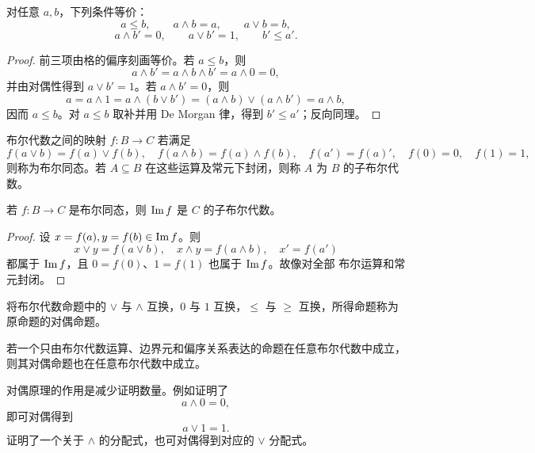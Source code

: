 \begin{theorem}[布尔代数中的偏序判定]\label{boolean-order-test}
  对任意 $a,b$，下列条件等价：
  \[
  a\le b,\qquad a\wedge b=a,\qquad a\vee b=b,
  \]
  \[
  a\wedge b'=0,\qquad a\vee b'=1,\qquad b'\le a'.
  \]
\end{theorem}

\begin{proof}
  前三项由格的偏序刻画等价。若 $a\le b$，则
  \[
  a\wedge b'=a\wedge b\wedge b'=a\wedge0=0,
  \]
  并由对偶性得到 $a\vee b'=1$。若 $a\wedge b'=0$，则
  \[
  a=a\wedge1=a\wedge(b\vee b')=(a\wedge b)\vee(a\wedge b')=a\wedge b,
  \]
  因而 $a\le b$。对 $a\le b$ 取补并用 De Morgan 律，得到
  $b'\le a'$；反向同理。
\end{proof}

\begin{definition}[布尔同态与子布尔代数]\label{boolean-homomorphism}
  布尔代数之间的映射 $f:B\to C$ 若满足
  \[
  f(a\vee b)=f(a)\vee f(b),\quad f(a\wedge b)=f(a)\wedge f(b),
  \quad f(a')=f(a)',\quad f(0)=0,\quad f(1)=1,
  \]
  则称为布尔同态。若 $A\subseteq B$ 在这些运算及常元下封闭，则称 $A$ 为
  $B$ 的子布尔代数。
\end{definition}

\begin{theorem}[布尔同态的像]\label{boolean-image}
  若 $f:B\to C$ 是布尔同态，则 $\operatorname{Im} f$ 是 $C$ 的子布尔代数。
\end{theorem}

\begin{proof}
  设 $x=f(a),y=f(b)\in\operatorname{Im} f$。则
  \[
  x\vee y=f(a\vee b),\quad x\wedge y=f(a\wedge b),\quad x'=f(a')
  \]
  都属于 $\operatorname{Im} f$，且 $0=f(0)$、$1=f(1)$ 也属于 $\operatorname{Im} f$。故像对全部
  布尔运算和常元封闭。
\end{proof}

\begin{definition}[对偶]\label{dual}
  将布尔代数命题中的 $\vee$ 与 $\wedge$ 互换，$0$ 与 $1$ 互换，$\le$ 与 $\ge$ 互换，所得命题称为原命题的对偶命题。
\end{definition}

\begin{theorem}[对偶原理]\label{duality}
  若一个只由布尔代数运算、边界元和偏序关系表达的命题在任意布尔代数中成立，则其对偶命题也在任意布尔代数中成立。
\end{theorem}

对偶原理的作用是减少证明数量。例如证明了
\[
a\wedge0=0,
\]
即可对偶得到
\[
a\vee1=1.
\]
证明了一个关于 $\wedge$ 的分配式，也可对偶得到对应的 $\vee$ 分配式。

